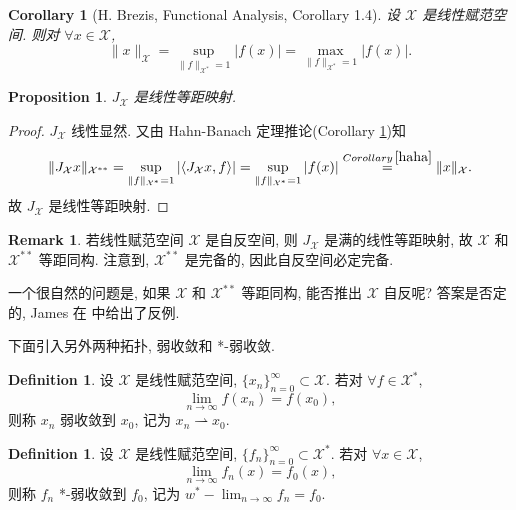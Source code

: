 \documentclass[a4paper,11pt]{article}
\newtheorem{corollary}[theorem]{Corollary}
\newtheorem{proposition}[theorem]{Proposition}
\theoremstyle{definition}
\newtheorem{remark}[theorem]{Remark}
\newtheorem{definition}[theorem]{Definition}
\begin{document}
\begin{CJK*}{UTF8}{gbsn}
\begin{corollary}[H. Brezis, Functional Analysis, Corollary 1.4] \label{haha}
    设 $ \mathcal{X} $ 是线性赋范空间. 则对 $ \forall x \in \mathcal{X} $,
    $$
        \| x \|_\mathcal{X} = \sup_{ \| f \|_{\mathcal{X}^*} = 1} |f(x)| 
                            = \max_{ \| f \|_{\mathcal{X}^*} = 1} |f(x)|.
    $$
\end{corollary}

\begin{proposition}
    $ J_\mathcal{X} $ 是线性等距映射.
\end{proposition}

\begin{proof}
    $ J_\mathcal{X} $ 线性显然. 又由 Hahn-Banach 定理推论(Corollary \ref{haha})知
    $$
        \| J_\mathcal{X} x \|_{\mathcal{X}^{**}} 
            = \sup_{ \| f \|_{\mathcal{X}^*} = 1} |\langle J_\mathcal{X} x, f \rangle|
            = \sup_{ \| f \|_{\mathcal{X}^*} = 1} |f(x)|
            \overset{Corollary \, \ref{haha}}{=} \| x \|_\mathcal{X}.
    $$
    故 $ J_\mathcal{X} $ 是线性等距映射.
\end{proof}

\begin{remark}
    若线性赋范空间 $ \mathcal{X} $ 是自反空间, 则 $ J_\mathcal{X} $ 是满的线性等距映射,
    故 $ \mathcal{X} $ 和 $ \mathcal{X}^{**} $ 等距同构. 
    注意到, $ \mathcal{X}^{**} $ 是完备的, 因此自反空间必定完备.
    
    一个很自然的问题是, 如果 $ \mathcal{X} $ 和 $ \mathcal{X}^{**} $ 等距同构, 
    能否推出 $ \mathcal{X} $ 自反呢? 答案是否定的, James 在 \cite{j51} 中给出了反例.
\end{remark}

下面引入另外两种拓扑, 弱收敛和 *-弱收敛.

\begin{definition}
    设 $ \mathcal{X} $ 是线性赋范空间, $ \{x_n\}_{n = 0}^\infty \subset \mathcal{X} $. 
    若对 $ \forall f \in \mathcal{X}^* $, 
    $$ 
        \lim_{n \to \infty} f(x_n) = f(x_0),
    $$
    则称 $ x_n $ 弱收敛到 $ x_0 $, 记为 $ x_n \rightharpoonup x_0 $.
\end{definition}

\begin{definition}
    设 $ \mathcal{X} $ 是线性赋范空间, $ \{f_n\}_{n = 0}^\infty \subset \mathcal{X}^* $. 
    若对 $ \forall x \in \mathcal{X} $, 
    $$ 
        \lim_{n \to \infty} f_n(x) = f_0(x),
    $$
    则称 $ f_n $ *-弱收敛到 $ f_0 $, 记为 $ w^*-\lim_{n \to \infty} f_n = f_0 $.
\end{definition}


\end{CJK*}
\end{document}
